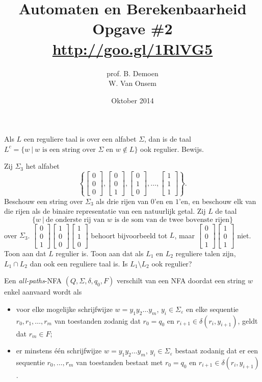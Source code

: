 \documentclass[a4paper]{article}
\title{Automaten en Berekenbaarheid\\Opgave \#2\\\url{http://goo.gl/1RlVG5}}
\author{prof. B. Demoen\\W. Van Onsem}
\date{Oktober 2014}
\newcommand{\kolom}[1]{ \left[ \begin{array}{c} #1 \end{array} \right] }
\begin{document}
\maketitle

\begin{question}
Als $L$ een reguliere taal is over een alfabet $\Sigma$, dan is de taal $L^c = \{ w \ | \ \mbox{$w$  is een string over $\Sigma$ en $w \not\in L$} \}$ ook regulier. Bewijs.
\end{question}

\begin{question}
Zij $\Sigma_3$ het alfabet 
{\tiny
	\[ \left\{ \kolom{ 0 \\ 0 \\ 0}, \kolom{ 0 \\ 0 \\ 1}, \kolom{ 0 \\ 1 \\ 0}, \ldots, \kolom{ 1 \\ 1 \\ 1} \right\}. \]
}
Beschouw een string over $\Sigma_3$ als drie rijen van $0$'en en $1$'en, en beschouw elk van die rijen als de binaire representatie van een natuurlijk getal. Zij $L$ de taal 
\[ \{ w \ | \ \mbox{de onderste rij van $w$ is de som van de twee bovenste rijen} \} \]
over $\Sigma_3$. {\tiny $\kolom{ 0 \\ 0 \\ 1} \kolom{ 1 \\ 0 \\ 0} \kolom{ 1 \\ 1 \\ 0}$} behoort bijvoorbeeld tot $L$, maar { \tiny $\kolom{ 0 \\0 \\ 1} \kolom{ 1 \\ 0 \\ 1}$} niet. Toon aan dat $L$ regulier is.
Toon aan dat als $L_1$ en $L_2$ reguliere talen zijn, $L_1 \cap L_2$ dan ook een reguliere taal is. Is $L_1 \setminus L_2$ ook regulier?
\end{question}

\begin{question}
Een \emph{all-paths}-NFA $(Q,\Sigma,\delta,q_0,F)$ verschilt van een NFA doordat een string $w$ enkel aanvaard wordt als 
\begin{itemize}
  \item voor elke mogelijke schrijfwijze $w = y_1 y_2 \ldots y_m$, $y_i \in \Sigma_{\varepsilon}$ en elke sequentie $r_0, r_1, \ldots, r_m$ van toestanden zodanig dat $r_0 = q_0$ en $r_{i+1} \in \delta(r_i,y_{i+1})$, geldt dat $r_m \in F$;
  \item er minstens \'e\'en schrijfwijze $w = y_1 y_2 \ldots y_m$, $y_i \in \Sigma_{\varepsilon}$ bestaat zodanig dat er een sequentie $r_0, \ldots, r_m$ van toestanden bestaat met $r_0 = q_0$ en $r_{i+1} \in \delta(r_i,y_{i+1})$.
\end{itemize}
\end{question}
\end{document}
